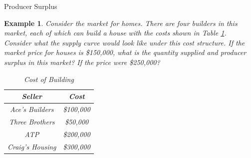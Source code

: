 \documentclass[xcolor={dvipsnames},pdf, hyperref={colorlinks=true, citecolor=ForestGreen, linkcolor=BlueViolet, urlcolor=Magenta}]{beamer}
\newtheorem{exmp}{Example}[section]
\begin{document}
\begin{frame}{Producer Surplus}
	
		\begin{exmp} 
			\small
			Consider the market for homes. There are four builders in this market, each of which can build a house with the costs shown in Table \ref{tab4}. Consider what the supply curve would look like under this cost structure. If the market price for houses is \$150,000, what is the quantity supplied and producer surplus in this market? If the price were \$250,000?
			
			\begin{table}[ht]
				\caption{Cost of Building}
				\label{tab4}
				\centering
				\begin{tabular}{ c|c}        
					
					Seller   & Cost \\
					\hline
					Ace's Builders & \$100,000 \\
					Three Brothers & \$50,000 \\
					ATP & \$200,000 \\
					Craig's Housing & \$300,000 \\
				\end{tabular}
			\end{table} 
		
		
		\end{exmp}

\end{frame}
\end{document}
